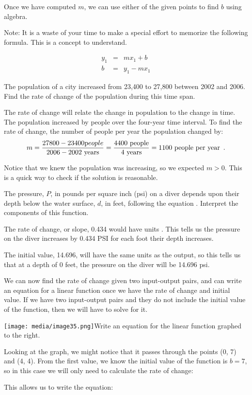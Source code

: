 Once we have computed $m$, we can use either of the given points to find $b$ using algebra.
\begin{note}
Note: It is a waste of your time to make a special effort to memorize the following formula. This is a concept to understand.
\end{note}
\begin{align*}
y_1 &=& mx_1 + b \\
b &=& y_1 - mx_1
\end{align*}

\begin{example}
The population of a city increased from 23,400 to 27,800 between 2002 and 2006. Find the rate of change of the population during this time span.

\solution The rate of change will relate the change in population to the change in time. The population increased by people over the four-year time interval. To find the rate of change, the number of people per year the population changed by:
$$m = \frac{27800-23400 \mbox people}{2006 - 2002 \mbox{ years}} = \frac{4400\mbox{ people}}{4\mbox{ years}} = 1100 \mbox{ people per year} \enspace .$$
\end{example}
Notice that we knew the population was increasing, so we expected $m>0$. This is a quick way to check if the solution is reasonable.

\begin{example}
The pressure, $P$, in pounds per square inch (psi) on a diver depends upon their depth below the water surface, $d$, in feet, following the equation . Interpret the components of this function.

\solution The rate of change, or slope, 0.434 would have units . This tells us the pressure on the diver increases by 0.434 PSI for each foot their depth increases.

The initial value, 14.696, will have the same units as the output, so this tells us that at a depth of 0 feet, the pressure on the diver will be 14.696 psi.
\end{example}

We can now find the rate of change given two input-output pairs, and can
write an equation for a linear function once we have the rate of change
and initial value. If we have two input-output pairs and they do not
include the initial value of the function, then we will have to solve
for it.

\begin{example}

\texttt{[image: media/image35.png]}Write
an equation for the linear function graphed to the right.

Looking at the graph, we might notice that it passes through the points
(0, 7) and (4, 4). From the first value, we know the initial value of
the function is $b = 7$, so in this case we will only need to
calculate the rate of change:

This allows us to write the equation:


\end{example}

